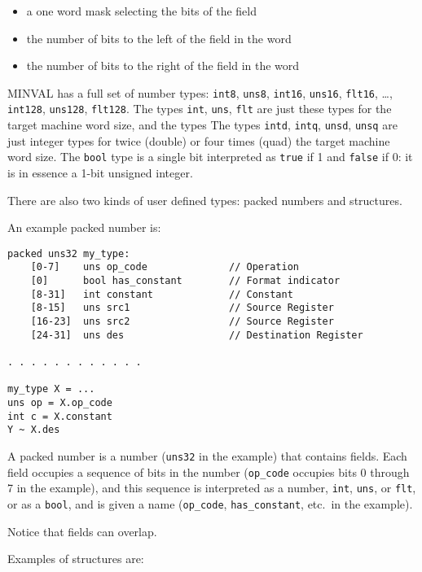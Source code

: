 \documentclass[12pt]{article}
\newenvironment{indpar}[1][0.3in]%
	{\begin{list}{}%
		     {\setlength{\itemsep}{0in}%
		      \setlength{\topsep}{0in}%
		      \setlength{\parsep}{1ex}%
		      \setlength{\labelwidth}{#1}%
		      \setlength{\leftmargin}{#1}%
		      \addtolength{\leftmargin}{\labelsep}}%
	 \item}%
	{\end{list}}
\begin{document}
\begin{itemize}
\item a one word mask selecting the bits of the field
\item the number of bits to the left of the field in the word
\item the number of bits to the right of the field in the word
\end{itemize}

MINVAL has a full set of number types:
{\tt int8}, {\tt uns8},
{\tt int16}, {\tt uns16}, {\tt flt16}, \ldots,
{\tt int128}, {\tt uns128}, {\tt flt128}.
The types {\tt int}, {\tt uns}, {\tt flt} are just these
types for the target machine word size, and the types
The types {\tt intd}, {\tt intq}, {\tt unsd}, {\tt unsq} are just integer
types for twice (double) or four times (quad) the target machine word size.
The {\tt bool} type is a single bit interpreted as {\tt true} if
1 and {\tt false} if 0: it is in essence a 1-bit unsigned integer.

There are also two kinds of user defined types: packed numbers
and structures.

An example packed number is:

\begin{indpar}\begin{verbatim}
packed uns32 my_type:
    [0-7]    uns op_code              // Operation
    [0]      bool has_constant        // Format indicator
    [8-31]   int constant             // Constant
    [8-15]   uns src1                 // Source Register
    [16-23]  uns src2                 // Source Register
    [24-31]  uns des                  // Destination Register

. . . . . . . . . . . .

my_type X = ...
uns op = X.op_code
int c = X.constant
Y ~ X.des
\end{verbatim}\end{indpar}

A packed number is a number ({\tt uns32} in the example)
that contains fields.  Each field occupies a sequence of
bits in the number ({\tt op\_code} occupies bits 0 through 7
in the example), and this sequence is interpreted as a
number, {\tt int}, {\tt uns}, or {\tt flt}, or as a {\tt bool},
and is given
a name ({\tt op\_code}, {\tt has\_constant}, etc.~in the
example).

Notice that fields can overlap.

Examples of structures are:
\end{document}
